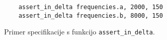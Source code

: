 \begin{figure}
\begin{verbatim}
    assert_in_delta frequencies.a, 2000, 150
    assert_in_delta frequencies.b, 8000, 150
\end{verbatim}
\caption{Primer specifikacije s funkcijo \texttt{assert\_in\_delta}.}
\label{fig:impl:assert_ergodic}
\end{figure}
